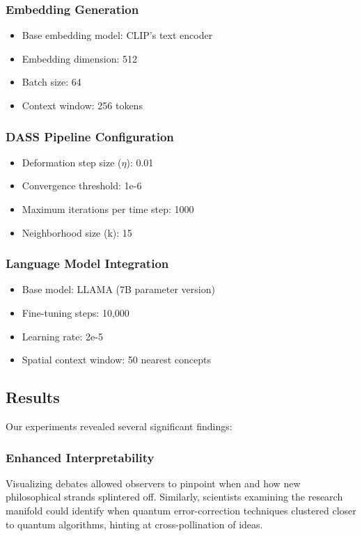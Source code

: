 \documentclass{article}
\begin{document}
\subsubsection{Embedding Generation}
\begin{itemize}
    \item Base embedding model: CLIP's text encoder
    \item Embedding dimension: 512
    \item Batch size: 64
    \item Context window: 256 tokens
\end{itemize}

\subsubsection{DASS Pipeline Configuration}
\begin{itemize}
    \item Deformation step size ($\eta$): 0.01
    \item Convergence threshold: 1e-6
    \item Maximum iterations per time step: 1000
    \item Neighborhood size (k): 15
\end{itemize}

\subsubsection{Language Model Integration}
\begin{itemize}
    \item Base model: LLAMA (7B parameter version)
    \item Fine-tuning steps: 10,000
    \item Learning rate: 2e-5
    \item Spatial context window: 50 nearest concepts
\end{itemize}

\subsection{Results}
Our experiments revealed several significant findings:

\subsubsection{Enhanced Interpretability}
Visualizing debates allowed observers to pinpoint when and how new philosophical strands splintered off. Similarly, scientists examining the research manifold could identify when quantum error-correction techniques clustered closer to quantum algorithms, hinting at cross-pollination of ideas.
\end{document}
